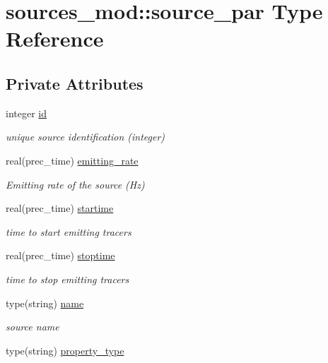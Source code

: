 \hypertarget{structsources__mod_1_1source__par}{}\section{sources\+\_\+mod\+:\+:source\+\_\+par Type Reference}
\label{structsources__mod_1_1source__par}
\subsection*{Private Attributes}
\begin{DoxyCompactItemize}
\item 
integer \hyperlink{structsources__mod_1_1source__par_a88d333946d18fee527b7b207f44dd3ff}{id}
\begin{DoxyCompactList}\small\item\em unique source identification (integer) \end{DoxyCompactList}\item 
real(prec\+\_\+time) \hyperlink{structsources__mod_1_1source__par_af5e6a5cc49766a9fb90fedadebb64b87}{emitting\+\_\+rate}
\begin{DoxyCompactList}\small\item\em Emitting rate of the source (Hz) \end{DoxyCompactList}\item 
real(prec\+\_\+time) \hyperlink{structsources__mod_1_1source__par_afcde2655b2a557f3a3e2c952dc8a51b0}{startime}
\begin{DoxyCompactList}\small\item\em time to start emitting tracers \end{DoxyCompactList}\item 
real(prec\+\_\+time) \hyperlink{structsources__mod_1_1source__par_ac2c04f0d36ad034e160e3de15fe0c283}{stoptime}
\begin{DoxyCompactList}\small\item\em time to stop emitting tracers \end{DoxyCompactList}\item 
type(string) \hyperlink{structsources__mod_1_1source__par_ac56d7761e7da3a906a3f0fbf4c7f49f8}{name}
\begin{DoxyCompactList}\small\item\em source name \end{DoxyCompactList}\item 
type(string) \hyperlink{structsources__mod_1_1source__par_a91107e1b59e5ca582c1afe6ff6263e29}{property\+\_\+type}

\end{DoxyCompactItemize}
